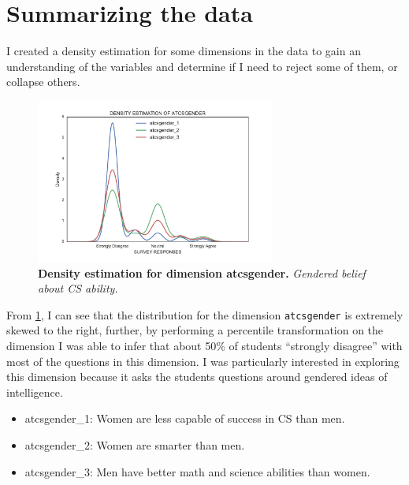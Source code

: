 \section*{Summarizing the data}
I created a density estimation for some dimensions in the data to gain an understanding of the variables and determine if I need to reject some of them, or collapse others. 

\begin{figure}[!hbtp]
\centering
    \caption{\textbf{Density estimation for dimension atcsgender. }\textit{Gendered belief about CS ability.}}\label{atcsgender_dimension}
    \includegraphics[width=0.7\textwidth]{figures/atcsgender_kde}
\end{figure}

From \ref{atcsgender_dimension}, I can see that the distribution for the dimension \texttt{atcsgender} is extremely skewed to the right, further, by performing a percentile transformation on the dimension I was able to infer that about 50\% of students ``strongly disagree'' with most of the questions in this dimension. I was particularly interested in exploring this dimension because it asks the students questions around gendered ideas of intelligence.
\begin {itemize}
\item atcsgender\_1: Women are less capable of success in CS than men.
\item atcsgender\_2: Women are smarter than men.
\item atcsgender\_3: Men have better math and science abilities than women.
\end{itemize} 

